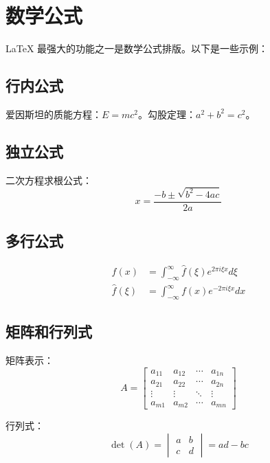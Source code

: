 \section{数学公式}%
\label{sec:math}

LaTeX 最强大的功能之一是数学公式排版。以下是一些示例：

\subsection{行内公式}
爱因斯坦的质能方程：$E = mc^2$。勾股定理：$a^2 + b^2 = c^2$。

\subsection{独立公式}
二次方程求根公式：
\[
x = \frac{-b \pm \sqrt{b^2 - 4ac}}{2a}
\]

\subsection{多行公式}
\begin{align}
f(x) &= \int_{-\infty}^{\infty} \hat{f}(\xi) e^{2 \pi i \xi x} d\xi \\
\hat{f}(\xi) &= \int_{-\infty}^{\infty} f(x) e^{-2 \pi i \xi x} dx
\end{align}

\subsection{矩阵和行列式}
矩阵表示：
\[
A = \begin{bmatrix}
a_{11} & a_{12} & \cdots & a_{1n} \\
a_{21} & a_{22} & \cdots & a_{2n} \\
\vdots & \vdots & \ddots & \vdots \\
a_{m1} & a_{m2} & \cdots & a_{mn}
\end{bmatrix}
\]

行列式：
\[
\det(A) = \begin{vmatrix}
a & b \\
c & d
\end{vmatrix} = ad - bc
\]
